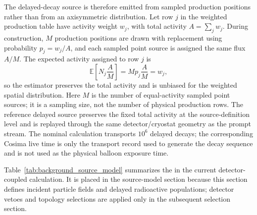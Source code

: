 \documentclass[11pt]{article}
\begin{document}
The delayed-decay source is therefore emitted from sampled production positions
rather than from an axisymmetric distribution. Let row $j$ in the weighted
production table have activity weight $w_j$, with total activity
$A=\sum_j w_j$. During construction, $M$ production positions are drawn with
replacement using probability $p_j=w_j/A$, and each sampled point source is
assigned the same flux $A/M$. The expected activity assigned to row $j$ is
\begin{equation}
  \mathbb{E}\!\left[N_j\frac{A}{M}\right] = M p_j \frac{A}{M} = w_j ,
\end{equation}
so the estimator preserves the total activity and is unbiased for the weighted
spatial distribution. Here $M$ is the number of equal-activity sampled point
sources; it is a sampling size, not the number of physical production rows. The
reference delayed source preserves the fixed total activity at the
source-definition level and is replayed through the same detector/cryostat
geometry as the prompt stream. The nominal calculation transports $10^6$
delayed decays; the corresponding Cosima live time is only the transport record
used to generate the decay sequence and is not used as the physical balloon
exposure time.

Table~\ref{tab:background_source_model} summarizes the  in the
current detector-coupled calculation. It is placed in the source-model section
because this section defines incident particle fields and delayed radioactive
populations; detector vetoes and topology selections are applied only in the
subsequent selection section.
\end{document}

